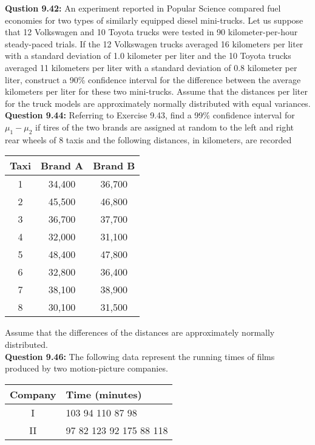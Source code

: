\documentclass{article}
\begin{document}
\textbf{Qustion 9.42:}
An experiment reported in Popular Science
compared fuel economies for two types of similarly
equipped diesel mini-trucks. Let us suppose that 12
Volkswagen and 10 Toyota trucks were tested in 90 
kilometer-per-hour steady-paced trials. If the 12 
Volkswagen trucks averaged 16 kilometers per liter with a
standard deviation of 1.0 kilometer per liter and the 10
Toyota trucks averaged 11 kilometers per liter with a
standard deviation of 0.8 kilometer per liter, construct
a 90\% confidence interval for the difference between the
average kilometers per liter for these two mini-trucks.
Assume that the distances per liter for the truck models 
are approximately normally distributed with equal
variances.\\\newline
\textbf{Question 9.44:}
Referring to Exercise 9.43, find a 99\% confidence
interval for $\mu_1 - \mu_2$ if tires of the two brands are 
assigned at random to the left and right rear wheels of
8 taxis and the following distances, in kilometers, are
recorded
\begin{center}
    \begin{tabular}{c c c}
        Taxi  & Brand A & Brand B\\
        \hline
        1 & 34,400 & 36,700 \\
        2 & 45,500 & 46,800 \\
        3 & 36,700 & 37,700 \\
        4 & 32,000 & 31,100 \\
        5 & 48,400 & 47,800 \\
        6 & 32,800 & 36,400 \\
        7 & 38,100 & 38,900 \\
        8 & 30,100 & 31,500 \\
    \end{tabular}
\end{center}
Assume that the differences of the distances are 
approximately normally distributed.\\\newline
\textbf{Question 9.46:}
The following data represent the running times
of films produced by two motion-picture companies.
\begin{center}
\begin{tabular}{c | l}
    Company & Time (minutes)\\
    \hline
    I & 103 94 110 87 98 \\
    II & 97 82 123 92 175 88 118
\end{tabular}
\end{center}
\end{document}
